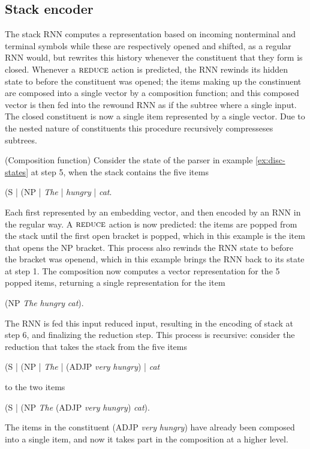 \subsection{Stack encoder}
The stack RNN computes a representation based on incoming nonterminal and terminal symbols while these are respectively opened and shifted, as a regular RNN would, but rewrites this history whenever the constituent that they form is closed. Whenever a $\textsc{reduce}$ action is predicted, the RNN rewinds its hidden state to before the constituent was opened; the items making up the constinuent are composed into a single vector by a composition function; and this composed vector is then fed into the rewound RNN as if the subtree where a single input. The closed constituent is now a single item represented by a single vector. Due to the nested nature of constituents this procedure recursively compresseses subtrees.

\begin{example}{(Composition function)}
  Consider the state of the parser in example \ref{ex:disc-states} at step 5, when the stack contains the five items
  \begin{center}
    (S | (NP | \textit{The} | \textit{hungry} | \textit{cat}.
  \end{center}
  Each first represented by an embedding vector, and then encoded by an RNN in the regular way. A $\textsc{reduce}$ action is now predicted: the items are popped from the stack until the first open bracket is popped, which in this example is the item that opens the NP bracket. This process also rewinds the RNN state to before the bracket was openend, which in this example brings the RNN back to its state at step 1. The composition now computes a vector representation for the 5 popped items, returning a single representation for the item
  \begin{center}
    (NP \textit{The} \textit{hungry} \textit{cat}).
  \end{center}
  The RNN is fed this input reduced input, resulting in the encoding of stack at step 6, and finalizing the reduction step. This process is recursive: consider the reduction that takes the stack from the five items
  \begin{center}
    (S | (NP | \textit{The} | (ADJP \textit{very} \textit{hungry}) | \textit{cat}
  \end{center}
  to the two items
  \begin{center}
    (S | (NP \textit{The} (ADJP \textit{very} \textit{hungry}) \textit{cat}).
  \end{center}
  The items in the constituent (ADJP \textit{very} \textit{hungry}) have already been composed into a single item, and now it takes part in the composition at a higher level.
\end{example}

